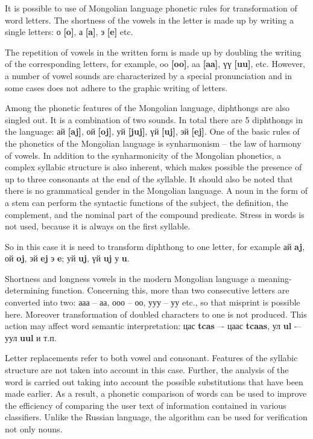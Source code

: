 \documentclass{svproc}
\begin{document}
It is possible to use of Mongolian language phonetic rules for transformation of word letters. The shortness of the vowels in the letter is made up by writing a single letters: о \textbf{[o]}, а \textbf{[a]}, э \textbf{[e]} etc.

The repetition of vowels in the written form is made up by doubling the writing of the corresponding letters, for example, oo \textbf{[oo]}, aa \textbf{[aa]}, үү \textbf{[uu]}, etc. However, a number of vowel sounds are characterized by a special pronunciation and in some cases does not adhere to the graphic writing of letters.

Among the phonetic features of the Mongolian language, diphthongs are also singled out. It is a combination of two sounds. In total there are 5 diphthongs in the language: ай \textbf{[aj]}, ой \textbf{[oj]}, уй \textbf{[juj]}, үй \textbf{[uj]}, эй \textbf{[ej]}. One of the basic rules of the phonetics of the Mongolian language is synharmonism -- the law of harmony of vowels. In addition to the synharmonicity of the Mongolian phonetics, a complex syllabic structure is also inherent, which makes possible the presence of up to three consonants at the end of the syllable. It should also be noted that there is no grammatical gender in the Mongolian language. A noun in the form of a stem can perform the syntactic functions of the subject, the definition, the complement, and the nominal part of the compound predicate. Stress in words is not used, because it is always on the first syllable.

So in this case it is need to transform diphthong to one letter, for example ай \textbf{aj}, ой \textbf{oj}, эй \textbf{ej} \rightarrow э \textbf{e}; уй \textbf{uj}, үй \textbf{uj} \rightarrow у \textbf{u}.

Shortness and longness vowels in the modern Mongolian language a meaning-determining function. Concerning this, more than two consecutive letters are converted into two: ааа -- аа, ооо -- оо, ууу -- уу etc., so that misprint is possible here. Moreover transformation of doubled characters to one is not produced. This action may affect word semantic interpretation: цас \textbf{tcas} –- цаас \textbf{tcaas}, ул \textbf{ul} -– уул \textbf{uul} и т.п.

Letter replacements refer to both vowel and consonant. Features of the syllabic structure are not taken into account in this case.
Further, the analysis of the word is carried out taking into account the possible substitutions that have been made earlier. As a result, a phonetic comparison of words can be used to improve the efficiency of comparing the user text of information contained in various classifiers. Unlike the Russian language, the algorithm can be used for verification not only nouns.
\end{document}
